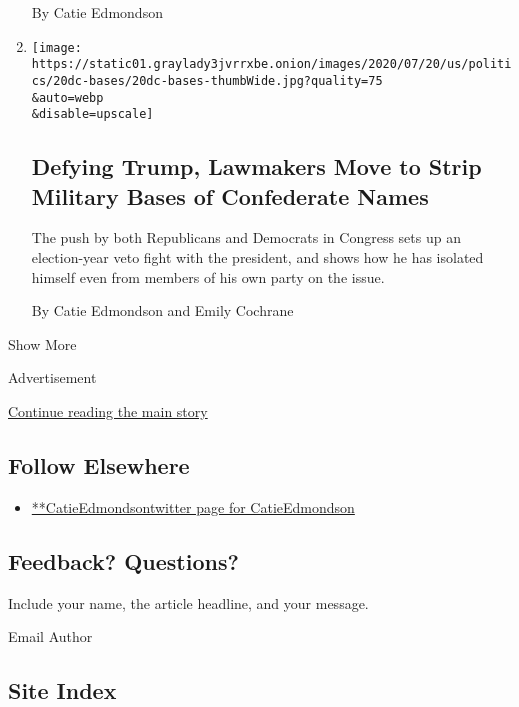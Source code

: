 \begin{enumerate}
  By Catie Edmondson
\item
  \href{/2020/07/20/us/politics/congress-trump-confederate-base-names.html}{}

  \texttt{[image: https://static01.graylady3jvrrxbe.onion/images/2020/07/20/us/politics/20dc-bases/20dc-bases-thumbWide.jpg?quality=75\\\&auto=webp\\\&disable=upscale]}

  \hypertarget{defying-trump-lawmakers-move-to-strip-military-bases-of-confederate-names}{%
  \subsection{Defying Trump, Lawmakers Move to Strip Military Bases of
  Confederate
  Names}\label{defying-trump-lawmakers-move-to-strip-military-bases-of-confederate-names}}

  The push by both Republicans and Democrats in Congress sets up an
  election-year veto fight with the president, and shows how he has
  isolated himself even from members of his own party on the issue.

  By Catie Edmondson and Emily Cochrane
\end{enumerate}

Show More

Advertisement

\protect\hyperlink{after-mid2}{Continue reading the main story}

\hypertarget{follow-elsewhere}{%
\subsection{Follow Elsewhere}\label{follow-elsewhere}}

\begin{itemize}
\tightlist
\item
  \href{https://twitter.com/CatieEdmondson}{**CatieEdmondsontwitter page
  for CatieEdmondson}
\end{itemize}

\hypertarget{feedback-questions}{%
\subsection{Feedback? Questions?}\label{feedback-questions}}

Include your name, the article headline, and your message.

Email Author

\hypertarget{site-index}{%
\subsection{Site Index}\label{site-index}}

